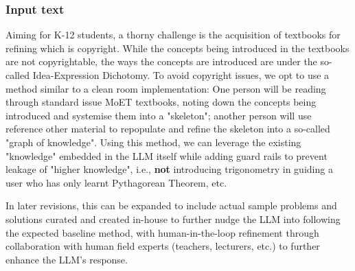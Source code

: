\subsubsection{Input text}
Aiming for K-12 students, a thorny challenge is the acquisition of textbooks for refining
 which is copyright. While the concepts being introduced in the textbooks are not copyrightable, the ways the concepts
 are introduced are under the so-called Idea-Expression Dichotomy. To avoid copyright issues, we opt to use a method
 similar to a clean room implementation: One person will be reading through standard issue MoET textbooks, noting down
 the concepts being introduced and systemise them into a "skeleton"; another person will use reference other material
 to repopulate and refine the skeleton into a so-called "graph of knowledge". Using this method, we can leverage the
 existing "knowledge" embedded in the LLM itself while adding guard rails to prevent leakage of "higher knowledge",
 i.e., \textbf{not} introducing trigonometry in guiding a user who has only learnt Pythagorean Theorem, etc. 

 In later revisions, this can be expanded to include actual sample problems and solutions curated and created in-house
 to further nudge the LLM into following the expected baseline method, with human-in-the-loop refinement through
 collaboration with human field experts (teachers, lecturers, etc.) to further enhance the LLM's response.